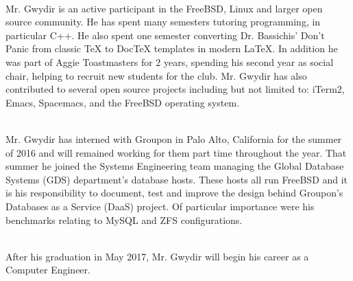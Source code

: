 \documentclass[12pt]{extarticle}
\begin{document}
\ \\
Mr. Gwydir is an active participant in the FreeBSD, Linux and larger open source community. He has spent many semesters tutoring programming, in particular C++. He also spent one semester converting Dr. Bassichis' Don't Panic from classic TeX to DocTeX templates in modern LaTeX. In addition he was part of Aggie Toastmasters for 2 years, spending his second year as social chair, helping to recruit new students for the club. Mr. Gwydir has also contributed to several open source projects including but not limited to: iTerm2, Emacs, Spacemacs, and the FreeBSD operating system.

\ \\
Mr. Gwydir has interned with Groupon in Palo Alto, California for the summer of 2016 and will remained working for them part time throughout the year. That summer he joined the Systems Engineering team managing the Global Database Systems (GDS) department's database hosts. These hosts all run FreeBSD and it is his responsibility to document, test and improve the design behind Groupon's Databases as a Service (DaaS) project. Of particular importance were his benchmarks relating to MySQL and ZFS configurations.

\ \\
After his graduation in May 2017, Mr. Gwydir will begin his career as a Computer Engineer.
\end{document}
